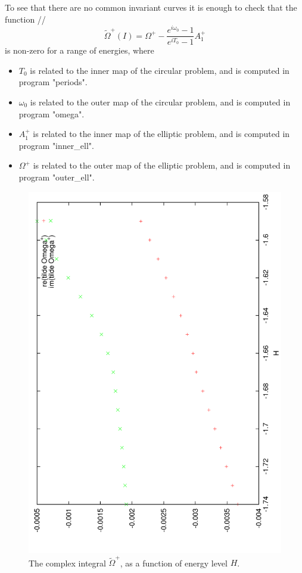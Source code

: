 \documentclass[a4paper]{amsart}
\theoremstyle{remark}
\begin{document}
To see that there are no common invariant curves it is enough to check
that the function
// \[ \tilde \Omega^+(I) = \Omega^+ - \frac{e^{i\omega_0}-1}{e^{iT_0}-1} A_1^+ \]
is non-zero for a range of energies, where
\begin{itemize}
\item $T_0$ is related to the inner map of the circular problem, and is
computed in program "periods".

\item $\omega_0$ is related to the outer map of the circular problem, and is
computed in program "omega".

\item $A_1^+$ is related to the inner map of the elliptic problem, and is
computed in program "inner\_ell".

\item $\Omega^+$ is related to the outer map of the elliptic problem, and is
computed in program "outer\_ell".
\end{itemize}

\begin{figure}
\includegraphics[angle=-90,width=\textwidth]{figs/tOmega}
\caption{The complex integral $\tilde \Omega^+$, as a function of energy level
$H$.}
\label{fig:tOmega}
\end{figure}
\end{document}
